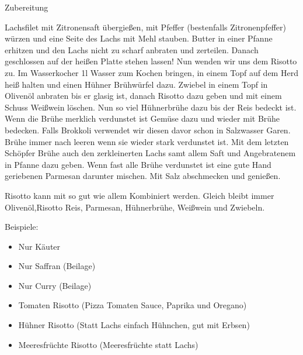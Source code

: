 {\Large Zubereitung} \newline
\begin{addmargin}[1cm]{0cm}
	Lachsfilet mit Zitronensaft übergießen, mit Pfeffer (bestenfalls Zitronenpfeffer) würzen und eine
	Seite des Lachs mit Mehl stauben. \newline
	Butter in einer Pfanne erhitzen und den Lachs nicht zu scharf anbraten und zerteilen.
	Danach geschlossen auf der heißen Platte stehen lassen! \newline
	Nun wenden wir uns dem Risotto zu. Im Wasserkocher 1l Wasser zum Kochen bringen, in einem Topf auf
	dem Herd heiß halten und einen Hühner Brühwürfel dazu. \newline
	Zwiebel in einem Topf in Olivenöl anbraten bis er glasig ist, danach Risotto dazu geben und mit
	einem Schuss Weißwein löschen. \newline Nun so viel Hühnerbrühe dazu bis der Reis bedeckt ist.
	Wenn die Brühe merklich verdunstet ist Gemüse dazu und wieder mit Brühe bedecken. \newline Falls Brokkoli
	verwendet wir diesen davor schon in Salzwasser Garen. \newline
	Brühe immer nach leeren wenn sie wieder stark verdunstet ist. Mit dem letzten Schöpfer Brühe auch
	den zerkleinerten Lachs samt allem Saft und Angebratenem in Pfanne dazu geben. \newline
	Wenn fast alle Brühe verdunstet ist eine gute Hand geriebenen Parmesan darunter mischen. \newline
	Mit Salz abschmecken und genießen.\newline\newline
	
	Risotto kann mit so gut wie allem Kombiniert werden. Gleich bleibt immer Olivenöl,Risotto Reis,
	Parmesan, Hühnerbrühe, Weißwein und Zwiebeln.\newline\newline
	
	Beispiele:
	\begin{itemize}
		\item Nur Käuter
		\item Nur Saffran (Beilage)
		\item Nur Curry (Beilage)
		\item Tomaten Risotto (Pizza Tomaten Sauce, Paprika und Oregano)
		\item Hühner Risotto (Statt Lachs einfach Hühnchen, gut mit Erbsen)
		\item Meeresfrüchte Risotto (Meeresfrüchte statt Lachs)
	\end{itemize}	
	
\end{addmargin}
